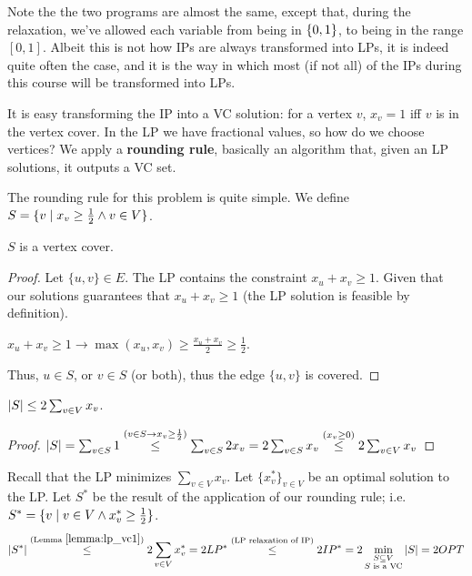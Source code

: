     Note the the two programs are almost the same, except that, during the relaxation, we've allowed each variable from being in $\{ 0,1 \}$, to being in the range $[0,1]$.
    Albeit this is not how IPs are always transformed into LPs, it is indeed quite often the case, and it is the way in which most (if not all) of the IPs during this course will be transformed into LPs.

    It is easy transforming the IP into a VC solution: for a vertex $v$, $x_v = 1$ iff $v$ is in the vertex cover.
    In the LP we have fractional values, so how do we choose vertices? We apply a \textbf{rounding rule}, basically an algorithm that, given an LP solutions, it outputs a VC set.

    The rounding rule for this problem is quite simple. We define $S = \{ v \; \vert \; x_v \geq \frac{1}{2} \wedge v \in V \}$.

    \begin{lemma}
        $S$ is a vertex cover.
    \end{lemma}

    \begin{proof}
        Let $\{ u,v \} \in E$. The LP contains the constraint $x_u + x_v \geq 1$.
        Given that our solutions guarantees that $x_u + x_v \geq 1$ (the LP solution is feasible by definition).

        $x_u + x_v \geq 1 \rightarrow \max (x_u, x_v) \geq \frac{x_u + x_v}{2} \geq \frac{1}{2}$.

        Thus, $u \in S$, or $v \in S$ (or both), thus the edge $\{ u,v \}$ is covered.
    \end{proof}

    \begin{lemma}\label{lemma:lp_vc1}
        $\vert S \vert \leq 2 \sum_{v \in V} x_v$.
    \end{lemma}

    \begin{proof}
        $\vert S \vert = \sum_{v \in S} 1 \overset{(v \in S \rightarrow x_v \geq \frac{1}{2})}{\leq} \sum_{v \in S} 2 x_v = 2 \sum_{v \in S} x_v \overset{(x_v \geq 0)}{\leq} 2 \sum_{v \in V} x_v$
    \end{proof}

    Recall that the LP minimizes $\sum_{v \in V} x_v$. Let $\{ x_v^* \}_{v \in V}$ be an optimal solution to the LP.
    Let $S^*$ be the result of the application of our rounding rule; i.e. $S^* = \{ v \; \vert \; v \in V \wedge x_v^* \geq \frac{1}{2} \}$.
    \[ \vert S^* \vert \overset{(\text{Lemma } \ref{lemma:lp_vc1})}{\leq} 2 \sum_{v \in V} x_v^* = 2 LP^* \overset{(\text{LP relaxation of IP})}{\leq} 2 IP^* = 2 \min_{\substack{S \subseteq V\\ S \text{ is a VC}}} \vert S \vert = 2 OPT \]

